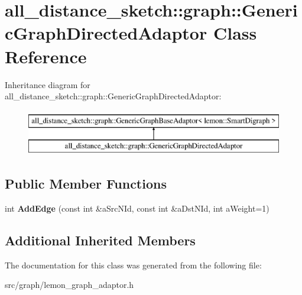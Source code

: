\hypertarget{classall__distance__sketch_1_1graph_1_1GenericGraphDirectedAdaptor}{}\section{all\+\_\+distance\+\_\+sketch\+:\+:graph\+:\+:Generic\+Graph\+Directed\+Adaptor Class Reference}
\label{classall__distance__sketch_1_1graph_1_1GenericGraphDirectedAdaptor}
Inheritance diagram for all\+\_\+distance\+\_\+sketch\+:\+:graph\+:\+:Generic\+Graph\+Directed\+Adaptor\+:\begin{figure}[H]
\begin{center}
\leavevmode
\includegraphics[height=2.000000cm]{classall__distance__sketch_1_1graph_1_1GenericGraphDirectedAdaptor}
\end{center}
\end{figure}
\subsection*{Public Member Functions}
\begin{DoxyCompactItemize}
\item 
\hypertarget{classall__distance__sketch_1_1graph_1_1GenericGraphDirectedAdaptor_add085679fa01f5b7cde7859b02ac9f48}{}int {\bfseries Add\+Edge} (const int \&a\+Src\+N\+Id, const int \&a\+Dst\+N\+Id, int a\+Weight=1)\label{classall__distance__sketch_1_1graph_1_1GenericGraphDirectedAdaptor_add085679fa01f5b7cde7859b02ac9f48}

\end{DoxyCompactItemize}
\subsection*{Additional Inherited Members}


The documentation for this class was generated from the following file\+:\begin{DoxyCompactItemize}
\item 
src/graph/lemon\+\_\+graph\+\_\+adaptor.\+h\end{DoxyCompactItemize}

